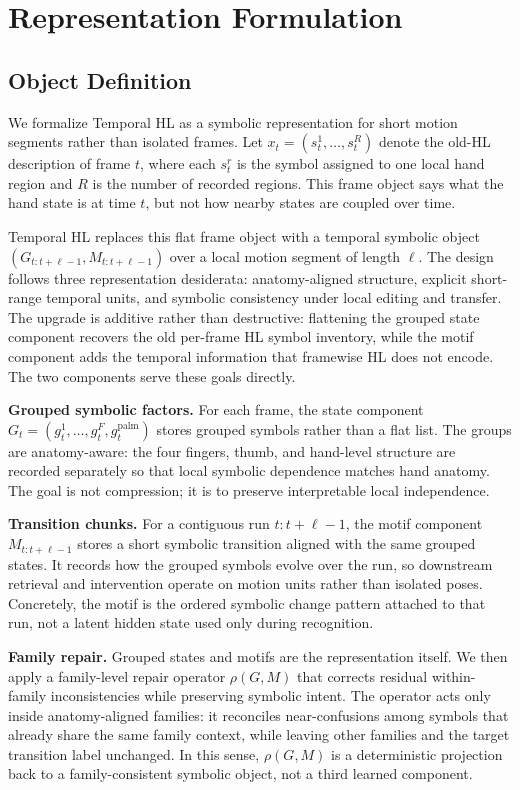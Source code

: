 \documentclass[letterpaper]{article}
\newcommand{\thl}{Temporal HL}
\begin{document}
\section{Representation Formulation}

\subsection{Object Definition}

We formalize \thl{} as a symbolic representation for short motion segments rather
than isolated frames. Let
$x_t = (s_t^1, \dots, s_t^R)$ denote the old-HL description of frame $t$, where
each $s_t^r$ is the symbol assigned to one local hand region and $R$ is the
number of recorded regions. This frame object says what the hand state is at
time $t$, but not how nearby states are coupled over time.

\thl{} replaces this flat frame object with a temporal symbolic object
$(G_{t:t+\ell-1}, M_{t:t+\ell-1})$ over a local motion segment of length
$\ell$. The design follows three representation desiderata: anatomy-aligned
structure, explicit short-range temporal units, and symbolic consistency under
local editing and transfer. The upgrade is additive rather than destructive:
flattening the grouped state component recovers the old per-frame HL symbol
inventory, while the motif component adds the temporal information that framewise
HL does not encode. The two components serve these goals directly.

\textbf{Grouped symbolic factors.}
For each frame, the state component
$G_t = (g_t^1, \dots, g_t^F, g_t^{\mathrm{palm}})$ stores grouped symbols rather
than a flat list. The groups are anatomy-aware: the four fingers, thumb, and
hand-level structure are recorded separately so that local symbolic dependence
matches hand anatomy. The goal is not compression; it is to preserve
interpretable local independence.

\textbf{Transition chunks.}
For a contiguous run $t{:}t{+}\ell{-}1$, the motif component
$M_{t:t+\ell-1}$ stores a short symbolic transition aligned with the same
grouped states. It records how the grouped symbols evolve over the run, so
downstream retrieval and intervention operate on motion units rather than
isolated poses. Concretely, the motif is the ordered symbolic change pattern
attached to that run, not a latent hidden state used only during recognition.

\textbf{Family repair.}
Grouped states and motifs are the representation itself. We then apply a
family-level repair operator $\rho(G, M)$ that corrects residual
within-family inconsistencies while preserving symbolic intent. The operator acts
only inside anatomy-aligned families: it reconciles near-confusions among symbols
that already share the same family context, while leaving other families and the
target transition label unchanged. In this sense, $\rho(G, M)$ is a
deterministic projection back to a family-consistent symbolic object, not a
third learned component.
\end{document}
